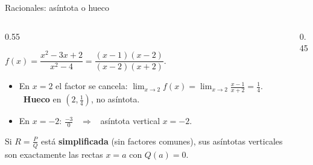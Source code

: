 \documentclass[10pt,aspectratio=169]{beamer}
\begin{document}
\begin{frame}{Racionales: asíntota o hueco}
  \begin{columns}
    \begin{column}{0.55\textwidth}
      \begin{ejemplo}[5]
        $f(x)=\dfrac{x^2-3x+2}{x^2-4}=\dfrac{(x-1)(x-2)}{(x-2)(x+2)}$.
        \begin{itemize}
          \item En $x=2$ el factor se cancela: $\lim_{x\to2}f(x)=\lim_{x\to2}\frac{x-1}{x+2}=\frac14$. \ \textbf{Hueco} en $(2,\frac14)$, no asíntota.
          \item En $x=-2$: $\frac{-3}{0}$ \ $\Rightarrow$ \ asíntota vertical $x=-2$.
        \end{itemize}
      \end{ejemplo}
      \begin{teorema}
        Si $R=\frac PQ$ está \textbf{simplificada} (sin factores comunes), sus asíntotas verticales son exactamente las rectas $x=a$
        con $Q(a)=0$.
      \end{teorema}
    \end{column}
    \begin{column}{0.45\textwidth}
      \centering
    \end{column}
  \end{columns}
\end{frame}
\end{document}
